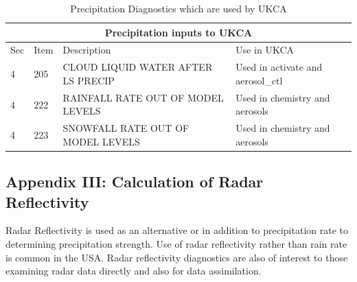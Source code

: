 \documentclass{UMDP_article}
\begin{document}
\begin{table}[htp]
\begin{center}
\begin{tabular}{|p{0.5cm}|p{0.7cm}|p{6cm}|p{6cm}|}
 \hline
 \multicolumn{4}{|c|}{Precipitation inputs to UKCA} \\
 \hline
 Sec   &  Item   &  Description   & Use in UKCA \\
4  &  205 & CLOUD LIQUID WATER AFTER LS PRECIP & Used in activate and aerosol\_ctl \\
4  &  222 & RAINFALL RATE OUT OF MODEL LEVELS  & Used in chemistry and aerosols \\
4  &  223 & SNOWFALL RATE OUT OF MODEL LEVELS  & Used in chemistry and aerosols \\
 \hline
\end{tabular}
\caption{\label{tab:ukca} Precipitation Diagnostics which are used by UKCA}
\end{center}
\end{table}

\clearpage
{}
{}
\subsection*{Appendix III: Calculation of Radar Reflectivity}
Radar Reflectivity is used as an alternative or in addition to precipitation 
rate to determining precipitation strength. Use of radar reflectivity rather 
than rain rate is common in the USA. Radar reflectivity diagnostics are also of 
interest to those examining radar data directly and also for data assimilation.
\end{document}
